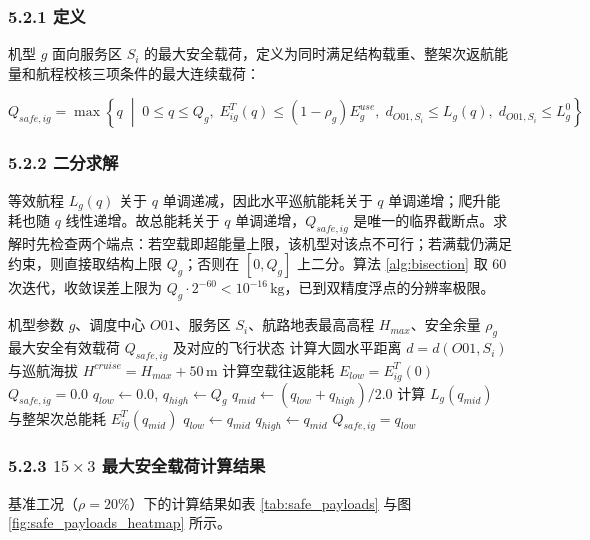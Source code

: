 \documentclass[withoutpreface,bwprint]{format}
\begin{document}
\subsubsection{5.2.1 定义}
机型 $g$ 面向服务区 $S_i$ 的最大安全载荷，定义为同时满足结构载重、整架次返航能量和航程校核三项条件的最大连续载荷：

\begin{equation}
Q_{safe, ig} = \max \left\{ q \;\middle|\; 0 \le q \le Q_g, \; E_{ig}^T(q) \le (1 - \rho_g) E_g^{use}, \; d_{O01, S_i} \le L_g(q), \; d_{O01, S_i} \le L_g^0 \right\}
\end{equation}

\subsubsection{5.2.2 二分求解}
等效航程 $L_g(q)$ 关于 $q$ 单调递减，因此水平巡航能耗关于 $q$ 单调递增；爬升能耗也随 $q$ 线性递增。故总能耗关于 $q$ 单调递增，$Q_{safe,ig}$ 是唯一的临界截断点。求解时先检查两个端点：若空载即超能量上限，该机型对该点不可行；若满载仍满足约束，则直接取结构上限 $Q_g$；否则在 $[0, Q_g]$ 上二分。算法 \ref{alg:bisection} 取 60 次迭代，收敛误差上限为 $Q_g \cdot 2^{-60} < 10^{-16}\,\text{kg}$，已到双精度浮点的分辨率极限。

\begin{algorithm}[H]
\caption{基于能耗二分搜索的最大安全载荷求解}
\label{alg:bisection}
\begin{algorithmic}[1]
\Require 机型参数 $g$、调度中心 $O01$、服务区 $S_i$、航路地表最高高程 $H_{max}$、安全余量 $\rho_g$
\Ensure 最大安全有效载荷 $Q_{safe, ig}$ 及对应的飞行状态
\State 计算大圆水平距离 $d = d(O01, S_i)$ 与巡航海拔 $H^{cruise} = H_{max} + 50\,\text{m}$
\State 计算空载往返能耗 $E_{low} = E_{ig}^T(0)$
    \State \Return $Q_{safe, ig} = 0.0$ 
\EndIf
\State $q_{low} \gets 0.0$, $q_{high} \gets Q_g$
    \State $q_{mid} \gets (q_{low} + q_{high}) / 2.0$
    \State 计算 $L_g(q_{mid})$ 与整架次总能耗 $E_{ig}^T(q_{mid})$
        \State $q_{low} \gets q_{mid}$ 
    \Else
        \State $q_{high} \gets q_{mid}$ 
    \EndIf
\EndFor
\State \Return $Q_{safe, ig} = q_{low}$
\end{algorithmic}
\end{algorithm}

\subsubsection{\texorpdfstring{5.2.3 $15\times 3$ 最大安全载荷计算结果}{5.2.3 15x3 最大安全载荷计算结果}}
基准工况（$\rho=20\%$）下的计算结果如表 \ref{tab:safe_payloads} 与图 \ref{fig:safe_payloads_heatmap} 所示。
\end{document}

